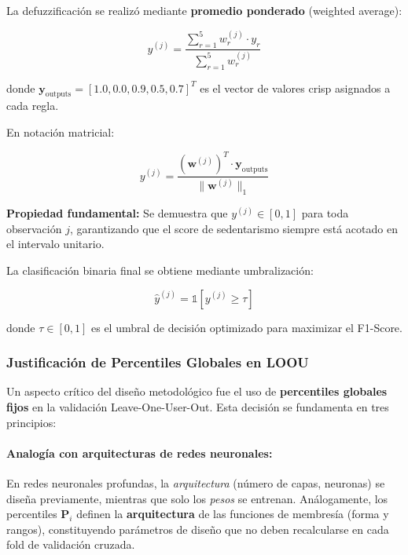 La defuzzificación se realizó mediante \textbf{promedio ponderado} (weighted average):

\begin{equation}
y^{(j)} = \frac{\sum_{r=1}^{5} w_r^{(j)} \cdot y_r}{\sum_{r=1}^{5} w_r^{(j)}}
\label{eq:defuzzificacion}
\end{equation}

donde \(\mathbf{y}_{\text{outputs}} = [1.0, 0.0, 0.9, 0.5, 0.7]^T\) es el vector de valores crisp asignados a cada regla.

En notación matricial:

\begin{equation}
y^{(j)} = \frac{(\mathbf{w}^{(j)})^T \cdot \mathbf{y}_{\text{outputs}}}{\|\mathbf{w}^{(j)}\|_1}
\label{eq:defuzz_matricial}
\end{equation}

\textbf{Propiedad fundamental:} Se demuestra que \(y^{(j)} \in [0, 1]\) para toda observación \(j\), garantizando que el score de sedentarismo siempre está acotado en el intervalo unitario.

La clasificación binaria final se obtiene mediante umbralización:

\begin{equation}
\hat{y}^{(j)} = \mathbb{1}[y^{(j)} \geq \tau]
\label{eq:binarizacion}
\end{equation}

donde \(\tau \in [0, 1]\) es el umbral de decisión optimizado para maximizar el F1-Score.

\subsubsection{Justificación de Percentiles Globales en LOOU}
\label{subsubsec:percentiles_globales}

Un aspecto crítico del diseño metodológico fue el uso de \textbf{percentiles globales fijos} en la validación Leave-One-User-Out. Esta decisión se fundamenta en tres principios:

\paragraph{Analogía con arquitecturas de redes neuronales:}
En redes neuronales profundas, la \textit{arquitectura} (número de capas, neuronas) se diseña previamente, mientras que solo los \textit{pesos} se entrenan. Análogamente, los percentiles \(\mathbf{P}_i\) definen la \textbf{arquitectura} de las funciones de membresía (forma y rangos), constituyendo parámetros de diseño que no deben recalcularse en cada fold de validación cruzada.

